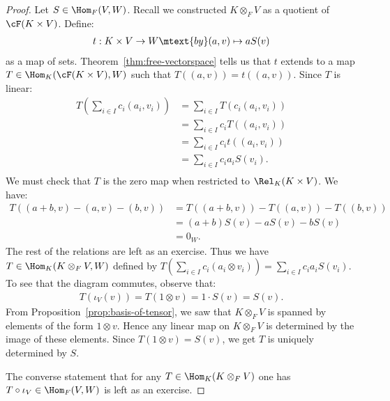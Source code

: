         \begin{proof}
            Let $S \in \Hom_F(V,W)$. Recall we constructed $K \otimes_F V$ as a quotient of $\cF(K \times V)$. Define:
                \begin{equation*}
                \begin{split}
                    t: K \times V \rightarrow W \mtext{by} (a,v) \mapsto aS(v)
                \end{split}
                \end{equation*}
            as a map of sets. Theorem~\ref{thm:free-vectorspace} tells us that $t$ extends to a map $T \in \Hom_K(\cF(K \times V), W)$ such that $T((a,v)) = t((a,v))$. Since $T$ is linear:
                \begin{equation*}
                \begin{split}
                    T \left(\sum_{i \in I} c_i(a_i,v_i)\right)
                    & = \sum_{i \in I}T(c_i(a_i,v_i)) \\
                    & = \sum_{i \in I}c_i T((a_i,v_i)) \\
                    & = \sum_{i \in I}c_i t((a_i,v_i)) \\
                    & = \sum_{i \in I}c_i a_i S(v_i). \\
                \end{split}
                \end{equation*}
            We must check that $T$ is the zero map when restricted to $\Rel_K(K \times V)$. We have:
                \begin{equation*}
                \begin{split}
                    T((a+b,v)-(a,v)-(b,v))
                    & = T((a+b,v)) - T((a,v)) - T((b,v)) \\
                    & = (a+b)S(v) - aS(v) - bS(v) \\
                    & = 0_W.
                \end{split}
                \end{equation*}
            The rest of the relations are left as an exercise. Thus we have $T \in \Hom_K(K \otimes_F V , W)$ defined by $T \left(\sum_{i \in I}c_i(a_i \otimes v_i)\right) = \sum_{i \in I}c_i a_i S(v_i)$. To see that the diagram commutes, observe that:
                \begin{equation*}
                \begin{split}
                    T(\iota_V(v)) = T(1 \otimes v) = 1 \cdot S(v) = S(v).
                \end{split}
                \end{equation*}
            From Proposition~\ref{prop:basis-of-tensor}, we saw that $K \otimes_F V$ is spanned by elements of the form $1 \otimes v$. Hence any linear map on $K \otimes_F V$ is determined by the image of these elements. Since $T(1 \otimes v) = S(v)$, we get $T$ is uniquely determined by $S$.

            The converse statement that for any $T \in \Hom_K(K \otimes_F V)$ one has $T \circ \iota_V \in \Hom_F(V,W)$ is left as an exercise.
        \end{proof}

